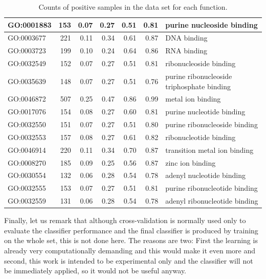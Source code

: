 \documentclass[11pt,twoside,a4paper]{book}
\begin{document}
\begin{table}
\begin{small}
\begin{center}
\begin{tabular}{lrrrrrl}
GO:0001883  &  153   &  0.07  & 0.27 & 0.51 & 0.81 &    purine nucleoside binding \\ \hline
GO:0003677  &  221   &  0.11  & 0.34 & 0.61 & 0.87 &    DNA binding \\ \hline
GO:0003723  &  199   &  0.10  & 0.24 & 0.64 & 0.86 &   RNA binding \\ \hline
GO:0032549  &  152   &  0.07  & 0.27 & 0.51 & 0.81 &    ribonucleoside binding \\ \hline
GO:0035639  &  148   &  0.07  & 0.27 & 0.51 & 0.76 &  purine ribonucleoside triphosphate binding \\ \hline
GO:0046872  &  507   &  0.25  & 0.47 & 0.86 & 0.99 &    metal ion binding \\ \hline
GO:0017076  &  154   &  0.08  & 0.27 & 0.60 & 0.81 &    purine nucleotide binding \\ \hline
GO:0032550  &  151   &  0.07  & 0.27 & 0.51 & 0.80 &   purine ribonucleoside binding \\ \hline
GO:0032553  &  157   &  0.08  & 0.27 & 0.61 & 0.82 & ribonucleotide binding \\ \hline
GO:0046914  &  220   &  0.11  & 0.34 & 0.70 & 0.87 &    transition metal ion binding \\ \hline
GO:0008270  &  185   &  0.09  & 0.25 & 0.56 & 0.87 &    zinc ion binding \\ \hline
GO:0030554  &  132   &  0.06  & 0.28 & 0.54 & 0.78 &   adenyl nucleotide binding \\ \hline
GO:0032555  &  153   &  0.07  & 0.27 & 0.51 & 0.81 &    purine ribonucleotide binding \\ \hline
GO:0032559  &  131   &  0.06  & 0.28 & 0.54 & 0.78 &   adenyl ribonucleotide binding \\ \hline
\end{tabular}
\end{center}
\end{small}
\caption{Counts of positive samples in the data set for each function.}
\label{table:terms}
\end{table}

Finally, let us remark that although cross-validation is normally used only to evaluate
the classifier performance and the final classifier is produced by training 
on the whole set, this is not done here.
The reasons are two: First the learning is already very computationally demanding
and this would make it even more and second, this work
is intended to be experimental only and the classifier will not be 
immediately applied, so it would not be useful anyway.
\end{document}
